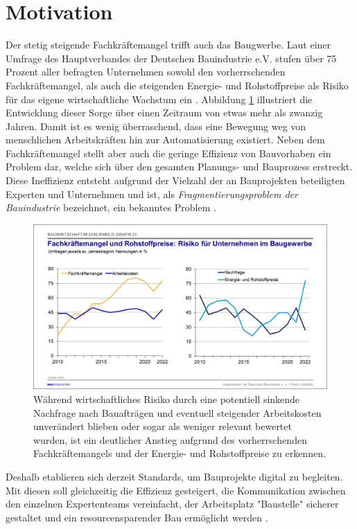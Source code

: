 \section{Motivation}\label{motivation}
Der stetig steigende Fachkräftemangel trifft auch das Baugwerbe. 
Laut einer Umfrage des Hauptverbandes der Deutschen Bauindustrie e.V. stufen über 75 Prozent aller befragten Unternehmen sowohl den vorherrschenden Fachkräftemangel, als auch die steigenden Energie- und Rohstoffpreise als Risiko für das eigene wirtschaftliche Wachstum ein \cite{Bauindustrie:online}.
Abbildung \ref{fig:Fachkräftemangel} illustriert die Entwicklung dieser Sorge über einen Zeitraum von etwas mehr als zwanzig Jahren.
Damit ist es wenig überraschend, dass eine Bewegung weg von menschlichen Arbeitskräften hin zur Automatisierung existiert.
Neben dem Fachkräftemangel stellt aber auch die geringe Effizienz von Bauvorhaben ein Problem dar, welche sich über den gesamten Planungs- und Bauprozess erstreckt. 
Diese Ineffizienz entsteht aufgrund der Vielzahl der an Bauprojekten beteiligten Experten und Unternehmen und ist, als \textit{Fragmentierungsproblem der Bauindustrie} bezeichnet, ein bekanntes Problem  \cite{ConstructionFragmentation}.
\begin{figure}[h]
    \centering
    \includegraphics[width=0.7\columnwidth]{fig/Grafik_23.jpg}
    \caption{Während wirtschaftliches Risiko durch eine potentiell sinkende Nachfrage nach Bauafträgen und eventuell steigender Arbeitskosten unverändert blieben oder sogar als weniger relevant bewertet wurden, ist ein deutlicher Anstieg aufgrund des vorherrschenden Fachkräftemangels und der Energie- und Rohstoffpreise zu erkennen.}
    \label{fig:Fachkräftemangel}
\end{figure}
Deshalb etablieren sich derzeit Standards, um Bauprojekte digital zu begleiten.
Mit diesen soll gleichzeitig die Effizienz gesteigert, die Kommunikation zwischen den einzelnen Expertenteams vereinfacht, der Arbeitsplatz "Baustelle" sicherer gestaltet und ein resourcensparender Bau ermöglicht werden \cite{BIMforHe12:online} \cite{Top10Ben31:online}.
